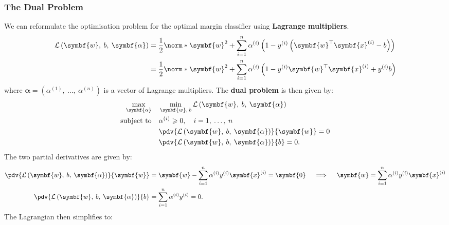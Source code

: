 \documentclass{article}
\begin{document}
\subsubsection{The Dual Problem}
We can reformulate the optimisation problem for the optimal margin
classifier using \textbf{Lagrange multipliers}.
\begin{align*}
    \mathcal{L}\left( \symbf{w},\: b,\: \symbf{\alpha} \right) & = \frac{1}{2}\norm*{\symbf{w}}^2 + \sum_{i = 1}^n \alpha^{\left( i \right)} \left( 1 - y^{\left( i \right)} \left( \symbf{w}^\top \symbf{x}^{\left( i \right)} - b \right) \right)       \\
                                                               & = \frac{1}{2}\norm*{\symbf{w}}^2 + \sum_{i = 1}^n \alpha^{\left( i \right)} \left( 1 - y^{\left( i \right)} \symbf{w}^\top \symbf{x}^{\left( i \right)} + y^{\left( i \right)} b \right)
\end{align*}
where \(\symbf{\alpha} = \left( \alpha^{\left( 1 \right)},\: \dots,\: \alpha^{\left( n \right)} \right)\)
is a vector of Lagrange multipliers. The \textbf{dual problem} is then
given by:
\begin{align*}
    \max_{\symbf{\alpha}} \quad & \min_{\symbf{w},\: b} \mathcal{L}\left( \symbf{w},\: b,\: \symbf{\alpha} \right) \\
    \text{subject to} \quad     & \alpha^{\left( i \right)} \geqslant 0, \quad i = 1,\: \dots,\: n                 \\
                                & \pdv{\mathcal{L}\left( \symbf{w},\: b,\: \symbf{\alpha} \right)}{\symbf{w}} = 0  \\
                                & \pdv{\mathcal{L}\left( \symbf{w},\: b,\: \symbf{\alpha} \right)}{b} = 0.
\end{align*}
The two partial derivatives are given by:
\begin{align*}
    \pdv{\mathcal{L}\left( \symbf{w},\: b,\: \symbf{\alpha} \right)}{\symbf{w}} & = \symbf{w} - \sum_{i = 1}^n \alpha^{\left( i \right)} y^{\left( i \right)} \symbf{x}^{\left( i \right)} = \symbf{0} \quad \implies \quad \symbf{w} = \sum_{i = 1}^n \alpha^{\left( i \right)} y^{\left( i \right)} \symbf{x}^{\left( i \right)} \\
    \pdv{\mathcal{L}\left( \symbf{w},\: b,\: \symbf{\alpha} \right)}{b}         & = \sum_{i = 1}^n \alpha^{\left( i \right)} y^{\left( i \right)} = 0.
\end{align*}
The Lagrangian then simplifies to:
\end{document}
